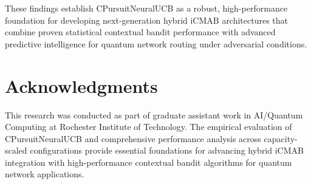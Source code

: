 \documentclass[12pt,a4paper]{article}
\begin{document}
These findings establish CPursuitNeuralUCB as a robust, high-performance foundation for developing next-generation hybrid iCMAB architectures that combine proven statistical contextual bandit performance with advanced predictive intelligence for quantum network routing under adversarial conditions.

\section{Acknowledgments}

This research was conducted as part of graduate assistant work in AI/Quantum Computing at Rochester Institute of Technology. The empirical evaluation of CPursuitNeuralUCB and comprehensive performance analysis across capacity-scaled configurations provide essential foundations for advancing hybrid iCMAB integration with high-performance contextual bandit algorithms for quantum network applications.
\end{document}
